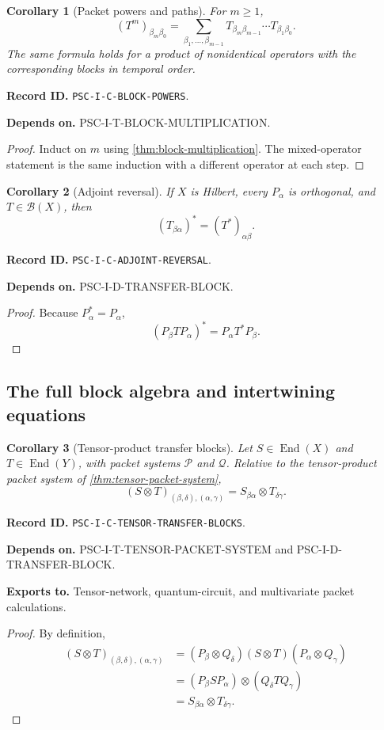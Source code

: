 \documentclass[11pt]{article}
\newtheorem{corollary}[corollary]{Corollary}
\theoremstyle{definition}
\theoremstyle{remark}
\newcommand{\Pcal}{\mathcal P}
\newcommand{\Qcal}{\mathcal Q}
\newcommand{\End}{\operatorname{End}}
\newcommand{\RecordID}[1]{\par\smallskip\noindent\begingroup\footnotesize\color{PSCGray}\raggedright\textbf{Record ID.} \nolinkurl{#1}.\par\endgroup}
\newcommand{\Depends}[1]{\par\noindent\begingroup\footnotesize\color{PSCGray}\raggedright\textbf{Depends on.} #1\par\endgroup}
\newcommand{\Exports}[1]{\par\noindent\begingroup\footnotesize\color{PSCGray}\raggedright\textbf{Exports to.} #1\par\endgroup}
\begin{document}
\begin{corollary}[Packet powers and paths]
\label{cor:block-powers}
For $m\geq1$,
\[
(T^m)_{\beta_m\beta_0}
=
\sum_{\beta_1,\ldots,\beta_{m-1}}
T_{\beta_m\beta_{m-1}}
\cdots
T_{\beta_1\beta_0}.
\]
The same formula holds for a product of nonidentical operators with the corresponding blocks in temporal order.
\end{corollary}
\RecordID{PSC-I-C-BLOCK-POWERS}
\Depends{PSC-I-T-BLOCK-MULTIPLICATION.}

\begin{proof}
Induct on $m$ using \cref{thm:block-multiplication}.  The mixed-operator statement is the same induction with a different operator at each step.
\end{proof}

\begin{corollary}[Adjoint reversal]
\label{cor:adjoint-reversal}
If $X$ is Hilbert, every $P_\alpha$ is orthogonal, and $T\in\mathcal B(X)$, then
\[
\boxed{(T_{\beta\alpha})^*=(T^*)_{\alpha\beta}.}
\]
\end{corollary}
\RecordID{PSC-I-C-ADJOINT-REVERSAL}
\Depends{PSC-I-D-TRANSFER-BLOCK.}

\begin{proof}
Because $P_\alpha^*=P_\alpha$,
\[
(P_\beta TP_\alpha)^*=P_\alpha T^*P_\beta.
\]
\end{proof}

\subsection{The full block algebra and intertwining equations}

\begin{corollary}[Tensor-product transfer blocks]
\label{cor:tensor-transfer-blocks}
Let \(S\in\End(X)\) and \(T\in\End(Y)\), with packet systems \(\Pcal\) and \(\Qcal\).  Relative to the tensor-product packet system of \cref{thm:tensor-packet-system},
\[
\boxed{
(S\otimes T)_{(\beta,\delta),(\alpha,\gamma)}
=
S_{\beta\alpha}\otimes T_{\delta\gamma}.
}
\]
\end{corollary}
\RecordID{PSC-I-C-TENSOR-TRANSFER-BLOCKS}
\Depends{PSC-I-T-TENSOR-PACKET-SYSTEM and PSC-I-D-TRANSFER-BLOCK.}
\Exports{Tensor-network, quantum-circuit, and multivariate packet calculations.}

\begin{proof}
By definition,
\begin{align*}
(S\otimes T)_{(\beta,\delta),(\alpha,\gamma)}
&=(P_\beta\otimes Q_\delta)(S\otimes T)(P_\alpha\otimes Q_\gamma)\\
&=(P_\beta SP_\alpha)\otimes(Q_\delta TQ_\gamma)\\
&=S_{\beta\alpha}\otimes T_{\delta\gamma}.
\end{align*}
\end{proof}
\end{document}
